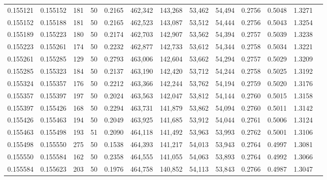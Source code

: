 \begin{tabular}{rrrrrrrrrrrrr}
0.155121 & 0.155152 &   181 &  50 &                                     0.2165 & 462,342 & 143,268 &  53,462 &  54,494 & 0.2756 & 0.5048 & 1.3271 \\
0.155152 & 0.155188 &   181 &  50 &                                     0.2165 & 462,523 & 143,087 &  53,512 &  54,444 & 0.2756 & 0.5043 & 1.3254 \\
0.155189 & 0.155223 &   180 &  50 &                                     0.2174 & 462,703 & 142,907 &  53,562 &  54,394 & 0.2757 & 0.5039 & 1.3238 \\
0.155223 & 0.155261 &   174 &  50 &                                     0.2232 & 462,877 & 142,733 &  53,612 &  54,344 & 0.2758 & 0.5034 & 1.3221 \\
0.155261 & 0.155285 &   129 &  50 &                                     0.2793 & 463,006 & 142,604 &  53,662 &  54,294 & 0.2757 & 0.5029 & 1.3209 \\
0.155285 & 0.155323 &   184 &  50 &                                     0.2137 & 463,190 & 142,420 &  53,712 &  54,244 & 0.2758 & 0.5025 & 1.3192 \\
0.155324 & 0.155357 &   176 &  50 &                                     0.2212 & 463,366 & 142,244 &  53,762 &  54,194 & 0.2759 & 0.5020 & 1.3176 \\
0.155357 & 0.155397 &   197 &  50 &                                     0.2024 & 463,563 & 142,047 &  53,812 &  54,144 & 0.2760 & 0.5015 & 1.3158 \\
0.155397 & 0.155426 &   168 &  50 &                                     0.2294 & 463,731 & 141,879 &  53,862 &  54,094 & 0.2760 & 0.5011 & 1.3142 \\
0.155426 & 0.155463 &   194 &  50 &                                     0.2049 & 463,925 & 141,685 &  53,912 &  54,044 & 0.2761 & 0.5006 & 1.3124 \\
0.155463 & 0.155498 &   193 &  51 &                                     0.2090 & 464,118 & 141,492 &  53,963 &  53,993 & 0.2762 & 0.5001 & 1.3106 \\
0.155498 & 0.155550 &   275 &  50 &                                     0.1538 & 464,393 & 141,217 &  54,013 &  53,943 & 0.2764 & 0.4997 & 1.3081 \\
0.155550 & 0.155584 &   162 &  50 &                                     0.2358 & 464,555 & 141,055 &  54,063 &  53,893 & 0.2764 & 0.4992 & 1.3066 \\
0.155584 & 0.155623 &   203 &  50 &                                     0.1976 & 464,758 & 140,852 &  54,113 &  53,843 & 0.2766 & 0.4987 & 1.3047 \\

\end{tabular}
